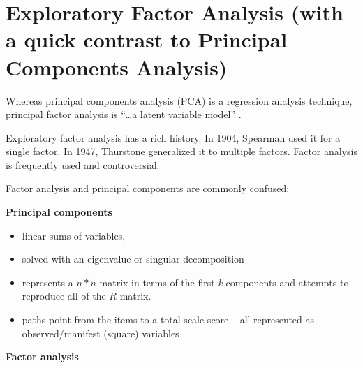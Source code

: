 \documentclass[
  english,
]{book}
\providecommand{\tightlist}{%
  \setlength{\itemsep}{0pt}\setlength{\parskip}{0pt}}
\begin{document}
\hypertarget{exploratory-factor-analysis-with-a-quick-contrast-to-principal-components-analysis}{%
\section{Exploratory Factor Analysis (with a quick contrast to Principal Components Analysis)}\label{exploratory-factor-analysis-with-a-quick-contrast-to-principal-components-analysis}}

Whereas principal components analysis (PCA) is a regression analysis technique, principal factor analysis is ``\ldots a latent variable model'' \citep{revelle_william_chapter_nodate}.

Exploratory factor analysis has a rich history. In 1904, Spearman used it for a single factor. In 1947, Thurstone generalized it to multiple factors. Factor analysis is frequently used and controversial.

Factor analysis and principal components are commonly confused:

\textbf{Principal components}

\begin{itemize}
\tightlist
\item
  linear sums of variables,
\item
  solved with an eigenvalue or singular decomposition
\item
  represents a \(n*n\) matrix in terms of the first \emph{k} components and attempts to reproduce all of the \(R\) matrix.
\item
  paths point from the items to a total scale score -- all represented as observed/manifest (square) variables
\end{itemize}

\textbf{Factor analysis}
\end{document}

